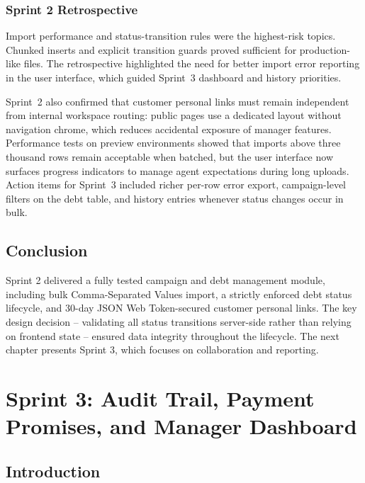 ﻿\documentclass[12pt,a4paper]{report}
\begin{document}
\subsection{Sprint 2 Retrospective}

Import performance and status-transition rules were the highest-risk topics.
Chunked inserts and explicit transition guards proved sufficient for production-like files.
The retrospective highlighted the need for better import error reporting in the user interface,
which guided Sprint~3 dashboard and history priorities.

Sprint~2 also confirmed that customer personal links must remain independent from internal
workspace routing: public pages use a dedicated layout without navigation chrome, which
reduces accidental exposure of manager features.
Performance tests on preview environments showed that imports above three thousand rows remain
acceptable when batched, but the user interface now surfaces progress indicators to manage agent
expectations during long uploads.
Action items for Sprint~3 included richer per-row error export, campaign-level filters on the debt
table, and history entries whenever status changes occur in bulk.

\section*{Conclusion}
{}

Sprint 2 delivered a fully tested campaign and debt management module, including bulk
Comma-Separated Values import, a strictly enforced debt status lifecycle, and 30-day JSON Web Token-secured
customer personal links.
The key design decision -- validating all status transitions server-side rather than
relying on frontend state -- ensured data integrity throughout the lifecycle.
The next chapter presents Sprint 3, which focuses on collaboration and reporting.

\clearpage
\chapter{Sprint 3: Audit Trail, Payment Promises, and Manager Dashboard}
\label{chap:sprint3}

\section*{Introduction}
{}
\end{document}
